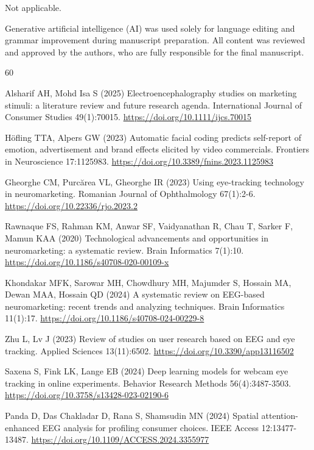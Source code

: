 \documentclass[pdflatex,sn-basic,Numbered,twocolumn,iicol]{sn-jnl}
\theoremstyle{thmstyleone}%
\theoremstyle{thmstyletwo}%
\theoremstyle{thmstylethree}%
\begin{document}
Not applicable.

Generative artificial intelligence (AI) was used solely for language editing and grammar improvement during manuscript preparation. All content was reviewed and approved by the authors, who are fully responsible for the final manuscript.

\begin{thebibliography}{60}
\small
\setlength{\itemsep}{-1.5pt}\setlength{\parsep}{0pt}

 Alsharif AH, Mohd Isa S (2025) Electroencephalography studies on marketing stimuli: a literature review and future research agenda. International Journal of Consumer Studies 49(1):70015. \url{https://doi.org/10.1111/ijcs.70015}

 H\"ofling TTA, Alpers GW (2023) Automatic facial coding predicts self-report of emotion, advertisement and brand effects elicited by video commercials. Frontiers in Neuroscience 17:1125983. \url{https://doi.org/10.3389/fnins.2023.1125983}

 Gheorghe CM, Purc\u{a}rea VL, Gheorghe IR (2023) Using eye-tracking technology in neuromarketing. Romanian Journal of Ophthalmology 67(1):2-6. \url{https://doi.org/10.22336/rjo.2023.2}

 Rawnaque FS, Rahman KM, Anwar SF, Vaidyanathan R, Chau T, Sarker F, Mamun KAA (2020) Technological advancements and opportunities in neuromarketing: a systematic review. Brain Informatics 7(1):10. \url{https://doi.org/10.1186/s40708-020-00109-x}

 Khondakar MFK, Sarowar MH, Chowdhury MH, Majumder S, Hossain MA, Dewan MAA, Hossain QD (2024) A systematic review on EEG-based neuromarketing: recent trends and analyzing techniques. Brain Informatics 11(1):17. \url{https://doi.org/10.1186/s40708-024-00229-8}

 Zhu L, Lv J (2023) Review of studies on user research based on EEG and eye tracking. Applied Sciences 13(11):6502. \url{https://doi.org/10.3390/app13116502}

 Saxena S, Fink LK, Lange EB (2024) Deep learning models for webcam eye tracking in online experiments. Behavior Research Methods 56(4):3487-3503. \url{https://doi.org/10.3758/s13428-023-02190-6}

 Panda D, Das Chakladar D, Rana S, Shamsudin MN (2024) Spatial attention-enhanced EEG analysis for profiling consumer choices. IEEE Access 12:13477-13487. \url{https://doi.org/10.1109/ACCESS.2024.3355977}


\end{thebibliography}
\end{document}
